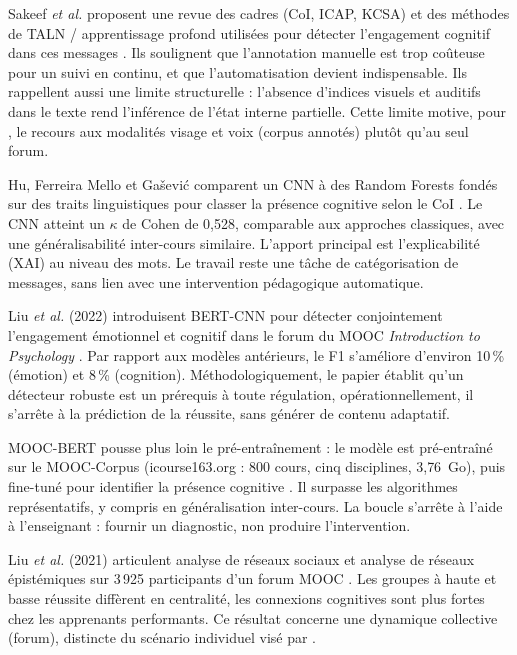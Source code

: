 Sakeef \emph{et al.} proposent une revue des cadres (CoI, ICAP, KCSA) et des
méthodes de TALN / apprentissage profond utilisées pour détecter l'engagement
cognitif dans ces messages \cite{sakeef2025detecting}. Ils soulignent que
l'annotation manuelle est trop coûteuse pour un suivi en continu, et que
l'automatisation devient indispensable. Ils rappellent aussi une limite
structurelle : l'absence d'indices visuels et auditifs dans le texte rend
l'inférence de l'état interne partielle. Cette limite motive, pour
\emolearn{}, le recours aux modalités visage et voix (corpus annotés)
plutôt qu'au seul forum.

Hu, Ferreira Mello et Gašević comparent un CNN à des Random Forests
fondés sur des traits linguistiques pour classer la présence cognitive
selon le CoI \cite{hu2021automatic}. Le CNN atteint un $\kappa$ de Cohen de
0,528, comparable aux approches classiques, avec une généralisabilité
inter-cours similaire. L'apport principal est l'explicabilité (XAI) au
niveau des mots. Le travail reste une tâche de catégorisation de messages,
sans lien avec une intervention pédagogique automatique.

Liu \emph{et al.} (2022) introduisent BERT-CNN pour détecter conjointement
l'engagement émotionnel et cognitif dans le forum du MOOC
\emph{Introduction to Psychology}
\cite{liu2022automated}. Par rapport aux modèles antérieurs, le F1
s'améliore d'environ 10\,\% (émotion) et 8\,\% (cognition).
Méthodologiquement, le papier établit qu'un détecteur robuste est un
prérequis à toute régulation, opérationnellement, il s'arrête à la
prédiction de la réussite, sans générer de contenu adaptatif.

MOOC-BERT pousse plus loin le pré-entraînement : le modèle est pré-entraîné
sur le MOOC-Corpus (icourse163.org : 800 cours, cinq disciplines,
3{,}76~Go), puis fine-tuné pour identifier la présence cognitive
\cite{liu2023moocbert}. Il surpasse les algorithmes représentatifs, y
compris en généralisation inter-cours. La boucle s'arrête à l'aide à
l'enseignant : fournir un diagnostic, non produire l'intervention.

Liu \emph{et al.} (2021) articulent analyse de réseaux sociaux et analyse de
réseaux épistémiques sur 3\,925 participants d'un forum MOOC
\cite{liu2021exploring}. Les groupes à haute et basse réussite diffèrent
en centralité, les connexions cognitives sont plus fortes chez les
apprenants performants. Ce résultat concerne une dynamique
collective (forum), distincte du scénario individuel visé par
\emolearn{}.

